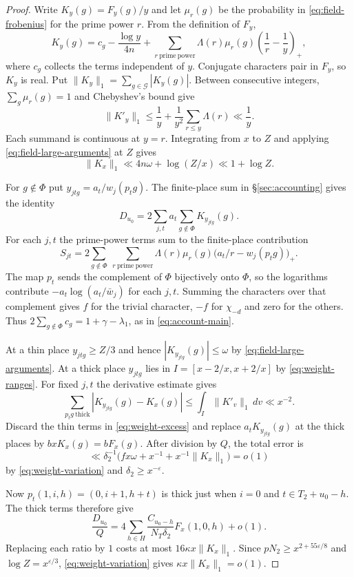 \begin{proof}
Write $K_y(g)=F_y(g)/y$ and let $\mu_r(g)$ be the probability
in \eqref{eq:field-frobenius} for the prime power $r$. From the
definition of $F_y$,
\[
  K_y(g)=c_g-\frac{\log y}{4n}
     +\sum_{r\ \mathrm{prime\ power}}\Lambda(r)\mu_r(g)
          \left(\frac1r-\frac1y\right)_+ ,
\]
where $c_g$ collects the terms independent of $y$. Conjugate
characters pair in $F_y$, so $K_y$ is real. Put
$\|K_y\|_1=\sum_{g\in\mathcal G}|K_y(g)|$. Between consecutive
integers, $\sum_g\mu_r(g)=1$ and Chebyshev's bound give
\[
  \|K'_y\|_1\le\frac1y+\frac1{y^2}\sum_{r\le y}\Lambda(r)
    \ll \frac1y.
\]
Each summand is continuous at $y=r$. Integrating from $x$ to $Z$
and applying \eqref{eq:field-large-arguments} at $Z$ gives
\begin{equation}\label{eq:weight-variation}
  \|K_x\|_1\ll 4n\omega+\log(Z/x)\ll 1+\log Z.
\end{equation}

For $g\notin\Phi$ put $y_{jtg}=a_t/w_j(p_tg)$. The finite-place sum
in \S\ref{sec:accounting} gives the identity
\begin{equation}\label{eq:weight-excess}
  D_{u_0}=2\sum_{j,t}a_t\sum_{g\notin\Phi}K_{y_{jtg}}(g).
\end{equation}
For each $j,t$ the prime-power terms sum to the finite-place
contribution \citep[Proposition~3.3]{adriazola-grh}
\[
   S_{jt}=2\sum_{g\notin\Phi}\ \sum_{r\ \mathrm{prime\ power}}
        \Lambda(r)\mu_r(g)\bigl(a_t/r-w_j(p_tg)\bigr)_+ .
\]
The map $p_t$ sends the complement of $\Phi$ bijectively onto $\Phi$,
so the logarithms contribute $-a_t\log(a_t/\bar w_j)$ for each $j,t$.
Summing the characters over that complement gives $f$ for the trivial
character, $-f$ for $\chi_{-d}$ and zero for the others.
Thus $2\sum_{g\notin\Phi}c_g=1+\gamma-\lambda_1$, as in
\eqref{eq:account-main}.

At a thin place $y_{jtg}\ge Z/3$ and hence
$|K_{y_{jtg}}(g)|\le\omega$ by \eqref{eq:field-large-arguments}.
At a thick place $y_{jtg}$ lies in $I=[x-2/x,x+2/x]$ by
\eqref{eq:weight-ranges}. For fixed $j,t$ the derivative estimate gives
\[
 \sum_{p_tg\ \mathrm{thick}}
   |K_{y_{jtg}}(g)-K_x(g)|
 \le \int_I\|K'_v\|_1\,dv\ll x^{-2}.
\]
Discard the thin terms in \eqref{eq:weight-excess} and replace
$a_t K_{y_{jtg}}(g)$ at the thick places by $bxK_x(g)=bF_x(g)$.
After division by $Q$, the total error is
\[
  \ll \delta_2^{-1}\bigl(fx\omega+x^{-1}
                      +x^{-1}\|K_x\|_1\bigr)=o(1)
\]
by \eqref{eq:weight-variation} and $\delta_2\ge x^{-\varepsilon}$.

Now $p_t(1,i,h)=(0,i+1,h+t)$ is thick just when $i=0$ and
$t\in T_2+u_0-h$. The thick terms therefore give
\[
  \frac{D_{u_0}}{Q}
    =4\sum_{h\in H}\frac{C_{u_0-h}}{N_T\delta_2}F_x(1,0,h)+o(1).
\]
Replacing each ratio by $1$ costs at most $16\kappa x\|K_x\|_1$.
Since $pN_2\ge x^{2+55\varepsilon/8}$ and $\log Z=x^{\varepsilon/3}$,
\eqref{eq:weight-variation} gives $\kappa x\|K_x\|_1=o(1)$.
\end{proof}

